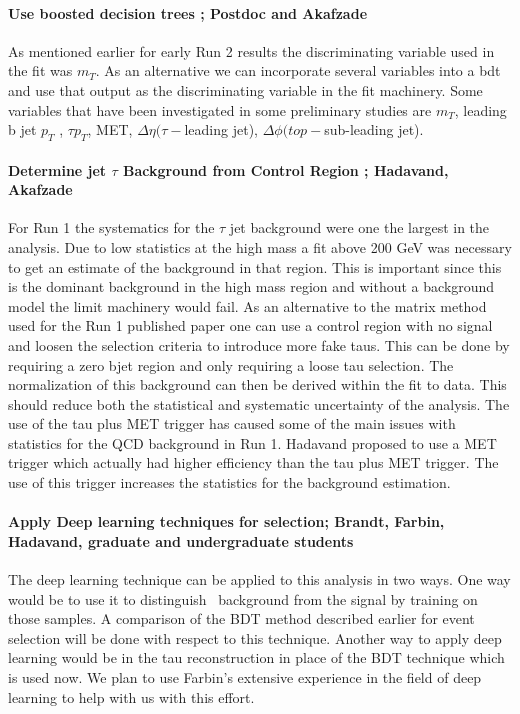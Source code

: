 \paragraph{Use boosted decision trees ;  Postdoc and Akafzade}
As mentioned earlier for early Run 2 results the discriminating variable used in the fit was $m_T$. As an alternative we can incorporate several 
variables into a bdt and use that output as the discriminating variable in the fit machinery.  Some variables that have been investigated in some preliminary studies
are $m_T$, leading b jet $p_T$ , $\tau p_T$, MET, $\Delta \eta(\tau-$leading jet), $\Delta \phi(top-$sub-leading jet).

\paragraph{Determine jet \too $\tau$ Background from Control Region ;  Hadavand, Akafzade}  %
For Run 1 the systematics for the $\tau$ \too jet background were one the largest in the analysis.  Due to low statistics at the high mass a fit above 200 GeV was necessary to get 
an estimate of the background in that region.  This is important since this is the dominant background in the high mass region and without a background model the limit machinery would fail.
As an alternative to the matrix method used for the Run 1 published paper one can use a control region with no signal and loosen the selection criteria to introduce more fake taus.  This can be done
by requiring a zero bjet region and only requiring a loose tau selection.  The normalization of this background can then be derived within the fit to data.  This should reduce both the statistical and systematic uncertainty of the analysis.
The use of the tau plus MET trigger has caused some of the main issues with statistics for the QCD background in Run 1. Hadavand proposed to use a MET trigger which actually had higher efficiency than the tau plus MET trigger.  
The use of this trigger increases the statistics for the background estimation.

\paragraph{Apply Deep learning techniques for selection; Brandt, Farbin, Hadavand, graduate and undergraduate students}
The deep learning technique can be applied to this analysis in two ways.  One way would be to use it to distinguish \ttbar\ background from the signal by training on those samples.
A comparison of the BDT method described earlier for event selection will be done with respect to this technique.
Another way to apply deep learning would be in the tau reconstruction in place of the BDT technique which is used now.  We plan to use Farbin's extensive experience in the field of deep learning 
to help with us with this effort. 


